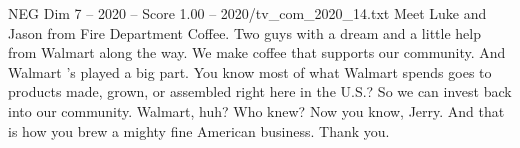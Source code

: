 \begin{textsample}{NEG Dim 7 – 2020 – Score 1.00 – 2020/tv\_com\_2020\_14.txt}  \label{ex:f7_neg_014}
Meet Luke and Jason from Fire Department Coffee.
Two guys with a dream and a little help from Walmart along the way.
We make coffee that supports our community.
And Walmart 's played a big part.
You know most of what Walmart spends goes to products made, grown, or assembled right here in the U.S.?
So we can invest back into our community.
Walmart, huh?
Who knew?
Now you know, Jerry.
And that is how you brew a mighty fine American business.
Thank you.

\end{textsample}
